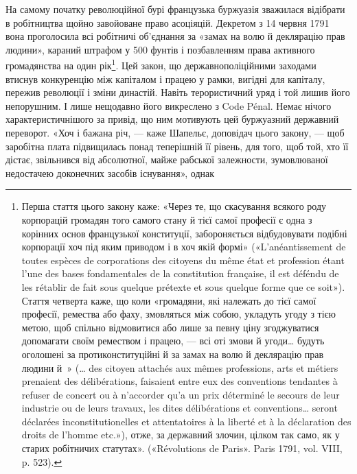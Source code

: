 На самому початку революційної бурі французька буржуазія
зважилася відібрати в робітництва щойно завойоване право
асоціяцій. Декретом з 14 червня 1791~ вона проголосила всі
робітничі об’єднання за «замах на волю й деклярацію прав людини»,
караний штрафом у 500 фунтів і позбавленням права
активного громадянства на один рік\footnote{
Перша стаття цього закону каже: «Через те, що скасування
всякого роду корпорацій громадян того самого стану й тієї самої професії
є одна з корінних основ французької конституції, забороняється відбудовувати
подібні корпорації хоч під яким приводом і в хоч якій формі»
(«L’anéantissement de toutes espèces de corporations des citoyens du même
état et profession étant l’une des bases fondamentales de la constitution
française, il est déféndu de les rétablir de fait sous quelque prétexte et
sous quelque forme que ce soit»). Стаття четверта каже, що коли «громадяни,
які належать до тієї самої професії, ремества або фаху, змовляться
між собою, укладуть угоду з тією метою, щоб спільно відмовитися
або лише за певну ціну згоджуватися допомагати своїм ремеством і працею,
— всі оті змови й угоди\dots{} будуть оголошені за протиконституційні
й за замах на волю й деклярацію прав людини й~» (\dots{} des citoyen
attachés aux mêmes professions, arts et métiers prenaient des délibérations,
faisaient entre eux des conventions tendantes à refuser de concert ou
à n’accorder qu’a un prix déterminé le secours de leur industrie ou de
leurs travaux, les dites délibérations et conventions\dots{} seront déclarées
inconstitutionelles et attentatoires à la liberté et à la déclaration des
droits de l’homme etc.»), отже, за державний злочин, цілком так само,
як у старих робітничих статутах». («Révolutions de Paris». Paris 1791,
vol. VIII, p. 523).
}. Цей закон, що державнополіційними
заходами втиснув конкуренцію між капіталом і
працею у рамки, вигідні для капіталу, пережив революції і зміни
династій. Навіть терористичний уряд і той лишив його непорушним.
І лише нещодавно його викреслено з Code Pénal. Немає
нічого характеристичнішого за привід, що ним мотивують
цей буржуазний державний переворот. «Хоч і бажана річ, —
каже Шапельє, доповідач цього закону, — щоб заробітна плата підвищилась
понад теперішній її рівень, для того, щоб той, хто її
дістає, звільнився від абсолютної, майже рабської залежности,
зумовлюваної недостачею доконечних засобів існування», однак
\parbreak{}  %
